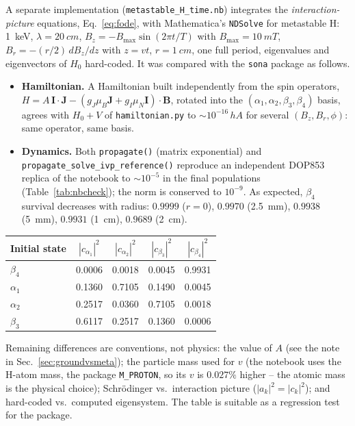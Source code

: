 \documentclass[11pt,a4paper]{article}
\begin{document}
A separate implementation (\texttt{metastable\_H\_time.nb}) integrates the
\emph{interaction-picture} equations, Eq.~\eqref{eq:fode}, with Mathematica's
\texttt{NDSolve} for metastable H: \SI{1}{keV}, $\lambda=\SI{20}{cm}$,
$B_z=-B_{\max}\sin(2\pi t/T)$ with $B_{\max}=\SI{10}{mT}$, $B_r=-(r/2)\,dB_z/dz$
with $z=vt$, $r=\SI{1}{cm}$, one full period, eigenvalues and eigenvectors of
$H_0$ hard-coded. It was compared with the \texttt{sona} package as follows.
\begin{itemize}
\item \textbf{Hamiltonian.} A Hamiltonian built independently from the spin
operators, $H=A\,\mathbf I\!\cdot\!\mathbf J-(g_J\mu_B\mathbf J+g_I\mu_N\mathbf I)\!\cdot\!\mathbf B$,
rotated into the $(\alpha_1,\alpha_2,\beta_3,\beta_4)$ basis, agrees with
$H_0+V$ of \texttt{hamiltonian.py} to $\sim10^{-16}\,hA$ for several
$(B_z,B_r,\phi)$: same operator, same basis.
\item \textbf{Dynamics.} Both \texttt{propagate()} (matrix exponential) and
\texttt{propagate\_solve\_ivp\_reference()} reproduce an independent DOP853
replica of the notebook to $\sim10^{-5}$ in the final populations
(Table~\ref{tab:nbcheck}); the norm is conserved to $10^{-9}$. As expected,
$\beta_4$ survival decreases with radius: $0.9999$ ($r{=}0$), $0.9970$
(\SI{2.5}{mm}), $0.9938$ (\SI{5}{mm}), $0.9931$ (\SI{1}{cm}), $0.9689$ (\SI{2}{cm}).
\end{itemize}
\begin{center}
\begin{tabular}{@{}lcccc@{}}
\toprule
Initial state & $|c_{\alpha_1}|^2$ & $|c_{\alpha_2}|^2$ & $|c_{\beta_3}|^2$ & $|c_{\beta_4}|^2$ \\
\midrule
$\beta_4$  & 0.0006 & 0.0018 & 0.0045 & 0.9931 \\
$\alpha_1$ & 0.1360 & 0.7105 & 0.1490 & 0.0045 \\
$\alpha_2$ & 0.2517 & 0.0360 & 0.7105 & 0.0018 \\
$\beta_3$  & 0.6117 & 0.2517 & 0.1360 & 0.0006 \\
\bottomrule
\end{tabular}
\label{tab:nbcheck}
\end{center}
Remaining differences are conventions, not physics: the value of $A$ (see the
note in Sec.~\ref{sec:groundvsmeta}); the particle mass used for $v$ (the
notebook uses the H-atom mass, the package \texttt{M\_PROTON}, so its $v$ is
$0.027\%$ higher -- the atomic mass is the physical choice); Schr\"odinger vs.\
interaction picture ($|a_k|^2=|c_k|^2$); and hard-coded vs.\ computed
eigensystem. The table is suitable as a regression test for the package.
\end{document}

